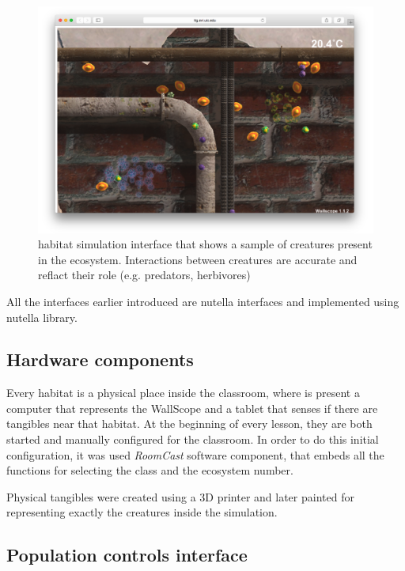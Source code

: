 \begin{figure}
\centering
\includegraphics[width=5in]{images/ecosystem-1.png}
\caption{habitat simulation interface that shows a sample of creatures present in the ecosystem. Interactions between creatures are accurate and reflact their role (e.g. predators, herbivores)}
\label{fig:ecosystem_1}
\end{figure}

All the interfaces earlier introduced are nutella interfaces and implemented using nutella library.

\subsection{Hardware components}
Every habitat is a physical place inside the classroom, where is present a computer that represents the WallScope and a tablet that senses if there are tangibles near that habitat. At the beginning of every lesson, they are both started and manually configured for the classroom. In order to do this initial configuration, it was used \textit{RoomCast} software component, that embeds all the functions for selecting the class and the ecosystem number.

Physical tangibles were created using a 3D printer and later painted for representing exactly the creatures inside the simulation.

\subsection{Population controls interface}
\label{subsec:population_control_interface}

